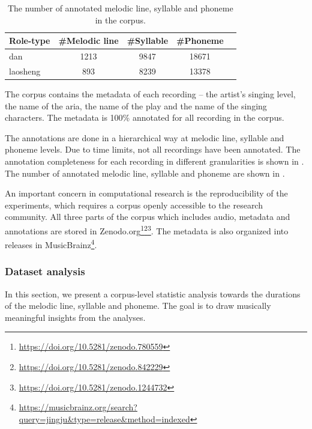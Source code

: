\begin{table}[ht]
    \centering
    \begin{tabular}{l|cccc}
        \toprule
        Role-type & \#Melodic line & \#Syllable & \#Phoneme \\
        \midrule
        dan           & 1213 	& 9847 	& 18671  	\\
        laosheng      & 893 	& 8239 	& 13378 	\\
        \bottomrule
    \end{tabular}
    \caption{The number of annotated melodic line, syllable and phoneme in the corpus.}
    \label{table:ch4:annotated_number}
\end{table}

The corpus contains the metadata of each recording -- the artist's singing level, the name of the aria, the name of the play and the name of the singing characters. The metadata is 100\% annotated for all recording in the corpus.

The annotations are done in a hierarchical way at melodic line, syllable and phoneme levels. Due to time limits, not all recordings have been annotated. The annotation completeness for each recording in different granularities is shown in . The number of annotated melodic line, syllable and phoneme are shown in .

An important concern in computational research is the reproducibility of the experiments, which requires a corpus openly accessible to the research community. All three parts of the corpus which includes audio, metadata and annotations are stored in Zenodo.org\footnote{\url{https://doi.org/10.5281/zenodo.780559}}\footnote{\url{https://doi.org/10.5281/zenodo.842229}}\footnote{\url{https://doi.org/10.5281/zenodo.1244732}}. The metadata is also organized into releases in MusicBrainz\footnote{\url{https://musicbrainz.org/search?query=jingju\&type=release\&method=indexed}}.

\subsubsection{Dataset analysis}

In this section, we present a corpus-level statistic analysis towards the durations of the melodic line, syllable and phoneme. The goal is to draw musically meaningful insights from the analyses. 

